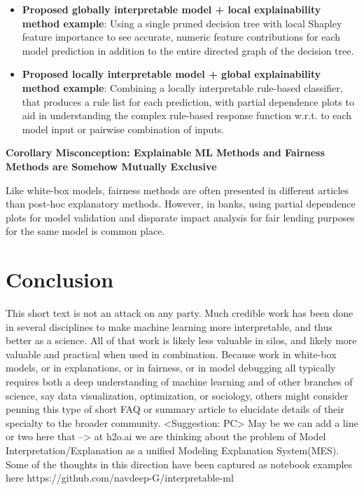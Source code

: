 \documentclass{article}
\begin{document}
\begin{itemize}
\item \textbf{Proposed globally interpretable model + local explainability method example}: Using a single pruned decision tree with local Shapley feature importance to see accurate, numeric feature contributions for each model prediction in addition to the entire directed graph of the decision tree.
\item \textbf{Proposed locally interpretable model + global explainability method example}: Combining a locally interpretable rule-based classifier, that produces a rule list for each prediction, with partial dependence plots to aid in understanding the complex rule-based response function w.r.t. to each model input or pairwise combination of inputs.  
\end{itemize}

\textbf{Corollary Misconception: Explainable ML Methods and Fairness Methods are Somehow Mutually Exclusive}

Like white-box models, fairness methods are often presented in different articles than post-hoc explanatory methods. However, in banks, using partial dependence plots for model validation and disparate impact analysis for fair lending purposes for the same model is common place.

\section{Conclusion}

This short text is not an attack on any party. Much credible work has been done in several disciplines to make machine learning more interpretable, and thus better as a science. All of that work is likely less valuable in silos, and likely more valuable and practical when used in combination. Because work in white-box models, or in explanations, or in fairness, or in model debugging all typically requires both a deep understanding of machine learning and of other branches of science, say data visualization, optimization, or sociology, others might consider penning this type of short FAQ or summary article to elucidate details of their specialty to the broader community.
<Suggestion: PC> May be we can add a line or two here that --> at h2o.ai we are thinking about the problem of Model Interpretation/Explanation as a unified Modeling Explanation System(MES). Some of the thoughts in this direction have been captured as notebook examples here https://github.com/navdeep-G/interpretable-ml




\end{document}
